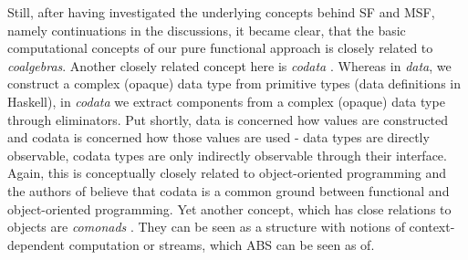 Still, after having investigated the underlying concepts behind SF and MSF, namely continuations in the discussions, it became clear, that the basic computational concepts of our pure functional approach is closely related to \textit{coalgebras}. %
Another closely related concept here is \textit{codata} \cite{downen_codata_2019}. Whereas in \textit{data}, we construct a complex (opaque) data type from primitive types (data definitions in Haskell), in \textit{codata} we extract components from a complex (opaque) data type through eliminators. Put shortly, data is concerned how values are constructed and codata is concerned how those values are used \cite{downen_codata_2019} - data types are directly observable, codata types are only indirectly observable through their interface. Again, this is conceptually closely related to object-oriented programming and the authors of \cite{downen_codata_2019} believe that codata is a common ground between functional and object-oriented programming. Yet another concept, which has close relations to objects are \textit{comonads} \cite{uustalu_essence_2006}. They can be seen as a structure with notions of  context-dependent computation or streams, which ABS can be seen as of.

%
%

